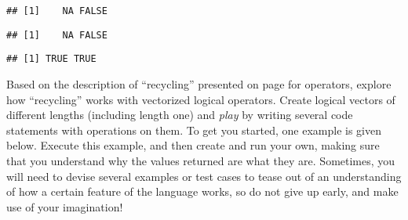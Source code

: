 \documentclass[krantz2]{krantz}\usepackage{knitr}
\begin{document}
\begin{knitrout}\footnotesize
{}\color{fgcolor}\begin{kframe}
\begin{alltt}
 \hlopt{&}  \hlopt{&} 
\end{alltt}
\begin{verbatim}
## [1]    NA FALSE
\end{verbatim}
\begin{alltt}
 \hlopt{&}  \hlopt{&} \hlstd{(}\hlstd{,} \hlstd{)}
\end{alltt}
\begin{verbatim}
## [1]    NA FALSE
\end{verbatim}
\begin{alltt}
 \hlopt{|}  \hlopt{|} \hlstd{(}\hlstd{,} \hlstd{)}
\end{alltt}
\begin{verbatim}
## [1] TRUE TRUE
\end{verbatim}
\end{kframe}
\end{knitrout}

\begin{playground}
Based on the description of ``recycling'' presented on page \pageref{par:recycling:numeric} for  operators, explore how ``recycling'' works with vectorized logical operators. Create logical vectors of different lengths (including length one) and \emph{play} by writing several code statements with operations on them. To get you started, one example is given below. Execute this example, and then create and run your own, making sure that you understand why the values returned are what they are. Sometimes, you will need to devise several examples or test cases to tease out of \Rlang an understanding of how a certain feature of the language works, so do not give up early, and make use of your imagination!

\begin{knitrout}\footnotesize
{}\color{fgcolor}\begin{kframe}
\begin{alltt}
 \hlkwb{<-} \hlstd{(}\hlstd{,} \hlstd{,} \hlstd{,} \hlstd{)}
 \hlopt{&} 
 \hlopt{|} \hlstd{(}\hlstd{,} \hlstd{)}
\end{alltt}
\end{kframe}
\end{knitrout}

\end{playground}
\end{document}
